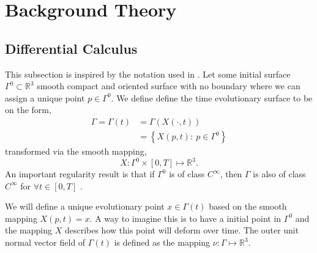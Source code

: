 

\section{Background Theory}%
\label{sec:background}


\subsection{Differential Calculus}%
\label{sub:differential_calculus}

This subsection is inspired by the notation used in \cite{kovacs2021convergent, dougan2012first}.
Let some initial surface $\Gamma^{0} \subset \mathbb{R} ^3  $ smooth compact and oriented surface with no boundary where we can assign a unique point $p \in \Gamma ^{0}$. We define define the time evolutionary surface to be on the form,
\[
    \begin{split}
\Gamma  = \Gamma \left( t \right) & = \Gamma \left( X \left(\cdot ,t \right)  \right) \\
                                  &= \left\{ X \left( p,t \right): \ p \in \Gamma^{0}  \right\}
    \end{split}
\]
transformed via the smooth mapping,
\[
X : \Gamma^{0} \times  \left[ 0,T \right]  \mapsto  \mathbb{R} ^3.
\]
An important regularity result is that if $\Gamma ^{0}$ is of class $C^{\infty}$, then $\Gamma $ is also of class $C^{\infty}$ for $\forall t \in \left[ 0,T \right] $ \cite{sokolowski1992introduction, dougan2012first}.

We will define a unique evolutionary point $x \in \Gamma \left( t \right) $ based on the smooth mapping $X \left( p,t \right) = x$. A way to imagine this is to have a initial point in $\Gamma ^{0}$ and the mapping $X $ describes how this point will deform over time. The outer unit normal vector field of $\Gamma \left( t \right) $ is defined as the mapping $\nu : \Gamma \mapsto
\mathbb{R} ^{3}$.

